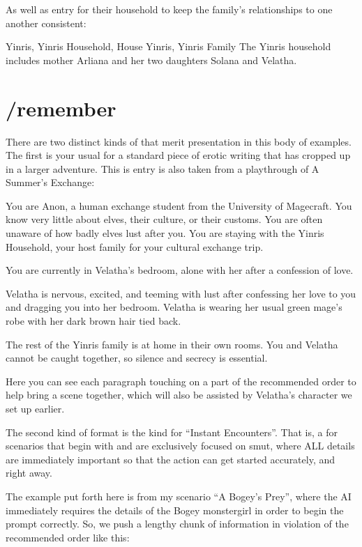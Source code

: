 \documentclass[Coomer-main.tex]{subfiles}
\begin{document}
As well as \wi entry for their household to keep the family’s relationships to one another consistent:

\begin{WI}{Yinris, Yinris Household, House Yinris, Yinris Family}
The Yinris household includes mother Arliana and her two daughters Solana and Velatha.
\end{WI}

\section{/remember}

There are two distinct kinds of \rem that merit presentation in this body of examples.
The first is your usual \rem for a standard piece of erotic writing that has cropped up in a larger adventure.
This is entry is also taken from a playthrough of A Summer’s Exchange:

\begin{/rm}
You are Anon, a human exchange student from the University of Magecraft.
You know very little about elves, their culture, or their customs.
You are often unaware of how badly elves lust after you.
You are staying with the Yinris Household, your host family for your cultural exchange trip.
\bigskip

You are currently in Velatha’s bedroom, alone with her after a confession of love.
\bigskip

Velatha is nervous, excited, and teeming with lust after confessing her love to you and dragging you into her bedroom.
Velatha is wearing her usual green mage’s robe with her dark brown hair tied back.
\bigskip

The rest of the Yinris family is at home in their own rooms.
You and Velatha cannot be caught together, so silence and secrecy is essential.
\end{/rm}

Here you can see each paragraph touching on a part of the recommended order to help bring a scene together, which will also be assisted by Velatha’s character \wi we set up earlier.

The second kind of \rem format is the kind for “Instant Encounters”.
That is, a \rem for scenarios that begin with and are exclusively focused on smut, where ALL details are immediately important so that the action can get started accurately, and right away.

The example put forth here is from my scenario “A Bogey’s Prey”, where the AI immediately requires the details of the Bogey monstergirl in order to begin the prompt correctly.
So, we push a lengthy chunk of information in violation of the recommended order like this:
\end{document}
